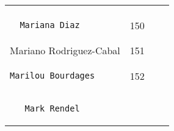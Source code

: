 \documentclass[]{article}
\begin{document}
\begin{longtable}[c]{@{}llll@{}}
\begin{minipage}[t]{0.15\columnwidth}
\end{minipage}
\\\noalign{\medskip}
\begin{minipage}[t]{0.39\columnwidth}\raggedright
\begin{verbatim}
  Mariana Diaz
\end{verbatim}
\end{minipage} & \begin{minipage}[t]{0.10\columnwidth}\raggedright
150
\end{minipage} & \begin{minipage}[t]{0.13\columnwidth}\raggedright
\end{minipage} & \begin{minipage}[t]{0.15\columnwidth}\raggedright
\end{minipage}
\\\noalign{\medskip}
\begin{minipage}[t]{0.39\columnwidth}\raggedright
Mariano Rodriguez-Cabal
\end{minipage} & \begin{minipage}[t]{0.10\columnwidth}\raggedright
151
\end{minipage} & \begin{minipage}[t]{0.13\columnwidth}\raggedright
\end{minipage} & \begin{minipage}[t]{0.15\columnwidth}\raggedright
\end{minipage}
\\\noalign{\medskip}
\begin{minipage}[t]{0.39\columnwidth}\raggedright
\begin{verbatim}
Marilou Bourdages
\end{verbatim}
\end{minipage} & \begin{minipage}[t]{0.10\columnwidth}\raggedright
152
\end{minipage} & \begin{minipage}[t]{0.13\columnwidth}\raggedright
\end{minipage} & \begin{minipage}[t]{0.15\columnwidth}\raggedright
\end{minipage}
\\\noalign{\medskip}
\begin{minipage}[t]{0.39\columnwidth}\raggedright
\begin{verbatim}
   Mark Rendel
\end{verbatim}
\end{minipage} & \begin{minipage}[t]{0.10\columnwidth}\raggedright

\end{minipage}
\end{longtable}
\end{document}
